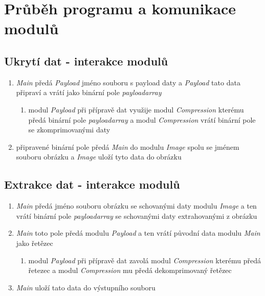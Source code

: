 \documentclass[12pt]{report}
\begin{document}
 
    
\section{Průběh programu a komunikace modulů}
    
\subsection{Ukrytí dat - interakce modulů}
    \begin{enumerate}
        \item \textit{Main} předá \textit{Payload} jméno souboru s payload daty a \textit{Payload} tato data připraví a vrátí jako binární pole \textit{payloadarray}  
        \begin{enumerate}
            \item modul \textit{Payload} při přípravě dat využije modul \textit{Compression} kterému předá binární pole \textit{payloadarray} a modul \textit{Compression} vrátí binární pole se zkomprimovanými daty
        \end{enumerate}
        \item připravené binární pole předá \textit{Main} do modulu \textit{Image} spolu se jménem souboru obrázku a \textit{Image} uloží tyto data do obrázku
    \end{enumerate}
    
\subsection{Extrakce dat - interakce modulů}
    \begin{enumerate}
        \item \textit{Main} předá jméno souboru obrázku se schovanými daty modulu \textit{Image} a ten vrátí binární pole \textit{payloadarray}  se schovanými daty extrahovanými z obrázku
        \item \textit{Main} toto pole předá modulu \textit{Payload} a ten vrátí původní data modulu \textit{Main} jako řetězec
        \begin{enumerate}
            \item  modul \textit{Payload} při přípravě dat zavolá modul \textit{Compression} kterému předá řetezec a modul \textit{Compression} mu předá dekomprimovaný řetězec
        \end{enumerate}
        \item \textit{Main} uloží tato data do výstupního souboru
    \end{enumerate}
\end{document}
